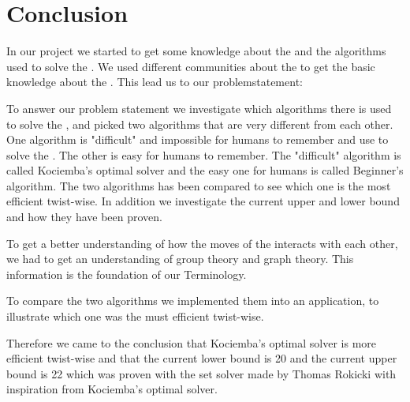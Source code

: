 \chapter{Conclusion}
In our project we started to get some knowledge about the \rubik{} and the algorithms used to solve the \rubik{}. We used different communities about the \rubik{} to get the basic knowledge about the \rubik{}. This lead us to our problemstatement:
%


\linebreak

To answer our problem statement we investigate which algorithms there is used to solve the \rubik{}, and picked two algorithms that are very different from each other. 
One algorithm is "difficult" and impossible for humans to remember and use to solve the \rubik{}. 
The other is easy for humans to remember. 
The "difficult" algorithm is called Kociemba's optimal solver and the easy one for humans is called Beginner's algorithm. 
The two algorithms has been compared to see which one is the most efficient twist-wise. 
In addition we investigate the current upper and lower bound and how they have been proven.

To get a better understanding of how the moves of the \rubik{} interacts with each other, we had to get an understanding of group theory and graph theory. This information is the foundation of our Terminology.

To compare the two algorithms we implemented them into an application, to illustrate which one was the must efficient twist-wise. 

Therefore we came to the conclusion that Kociemba's optimal solver is more efficient twist-wise and that the current lower bound is 20 and the current upper bound is 22 which was proven with the set solver made by Thomas Rokicki with inspiration from Kociemba's optimal solver.

